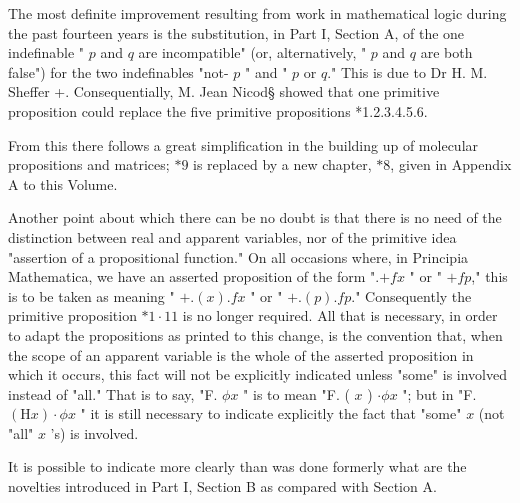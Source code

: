 \documentclass[10pt]{article}
\begin{document}
The most definite improvement resulting from work in mathematical logic during the past fourteen years is the substitution, in Part I, Section A, of the one indefinable " $p$ and $q$ are incompatible" (or, alternatively, " $p$ and $q$ are both false") for the two indefinables "not- $p$ " and " $p$ or $q$." This is due to Dr H. M. Sheffer +. Consequentially, M. Jean Nicod§ showed that one primitive proposition could replace the five primitive propositions *1.2.3.4.5.6.

From this there follows a great simplification in the building up of molecular propositions and matrices; $* 9$ is replaced by a new chapter, $* 8$, given in Appendix A to this Volume.

Another point about which there can be no doubt is that there is no need of the distinction between real and apparent variables, nor of the primitive idea "assertion of a propositional function." On all occasions where, in Principia Mathematica, we have an asserted proposition of the form ".$+ f x$ " or " $+f p$," this is to be taken as meaning " $+.(x) . f x$ " or " $+.(p) . f p$." Consequently the primitive proposition $* 1 \cdot 11$ is no longer required. All that is necessary, in order to adapt the propositions as printed to this change, is the convention that, when the scope of an apparent variable is the whole of the asserted proposition in which it occurs, this fact will not be explicitly indicated unless "some" is involved instead of "all." That is to say, "F. $\phi x$ " is to mean "F. ( $x$ ) $\cdot \phi x$ "; but in "F. $(\mathrm{H} x) \cdot \phi x$ " it is still necessary to indicate explicitly the fact that "some" $x$ (not "all" $x$ 's) is involved.

It is possible to indicate more clearly than was done formerly what are the novelties introduced in Part I, Section B as compared with Section A.
\end{document}
